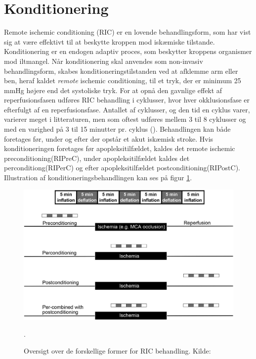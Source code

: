 \section{Konditionering}
Remote ischemic conditioning (RIC) er en lovende behandlingsform, som har vist sig at være effektivt til at beskytte kroppen mod iskæmiske tilstande. Konditionering er en endogen adaptiv proces, som beskytter kroppens organismer mod iltmangel. Når konditionering skal anvendes som non-invasiv behandlingsform, skabes konditioneringstilstanden ved at afklemme arm eller ben, heraf kaldet \textit{remote} ischemic conditioning, til et tryk, der er minimum 25 mmHg højere end det systoliske tryk. For at opnå den gavnlige effekt af reperfusionsfasen udføres RIC behandling i cyklusser, hvor hver okklusionsfase er efterfulgt af en reperfusionsfase. Antallet af cyklusser, og den tid en cyklus varer, varierer meget i litteraturen, men som oftest udføres mellem 3 til 8 cyklusser og med en varighed på 3 til 15 minutter pr. cyklus (\cite{RefWorks:3}).
Behandlingen kan både foretages før, under og efter der opstår et akut iskæmisk stroke. Hvis konditioneringen foretages før apopleksitilfældet, kaldes det remote ischemic preconditioning(RIPreC), under apopleksitilfældet kaldes det perconditiong(RIPerC) og efter apopleksitilfældet postconditioning(RIPostC). Illustration af konditioneringsbehandlingen kan ses på figur \ref{fig:cycles}.

\begin{figure}[H]
	\includegraphics[width = \textwidth]{billeder/PrePerPostKonditionering.png}
	\caption{Oversigt over de forskellige former for RIC behandling. Kilde: \cite{RefWorks:3}}\label{fig:cycles}. 
\end{figure}

